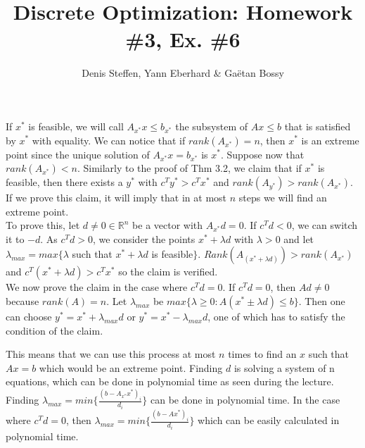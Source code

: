 \documentclass[a4paper,11pt,french]{article}
\title{Discrete Optimization: Homework \#3, Ex. \#6}
\author{Denis Steffen, Yann Eberhard \& Gaëtan Bossy}
\begin{document}
\maketitle
If $x^*$ is feasible, we will call $A_{x^*}x\leq b_{x^*}$ the subsystem of $Ax\leq b$ that is satisfied by $x^*$ with equality. 
We can notice that if $rank(A_{x^*}) = n$, then $x^*$ is an extreme point since the unique solution of $A_{x^*}x = b_{x^*}$ is $x^*$.
Suppose now that $rank(A_{x^*}) < n$. Similarly to the proof of Thm 3.2, we claim that if $x^*$ is feasible, then there exists a $y^*$ with $c^T y^* > c^T x^*$ and $rank(A_{y^*}) > rank(A_{x^*})$. If we prove this claim, it will imply that in at most $n$ steps we will find an extreme point.\\
To prove this, let $d \not= 0 \in \mathbb{R}^n$ be a vector with $A_{x^*}d = 0$. If $c^T d < 0$, we can switch it to $-d$. As $c^T d > 0$, we consider the points $x^* + \lambda d$ with $\lambda> 0$ and let $\lambda_{max}=max\{\lambda$ such that $x^* + \lambda d$ is feasible$\}$. 
$Rank(A_{(x^*+\lambda d)})>rank(A_{x^*})$ and $c^T(x^*+\lambda d)>c^Tx^*$ so the claim is verified. \\
We now prove the claim in the case where $c^T d = 0$. If $c^Td=0$, then $Ad \not= 0$ because $rank(A) = n$. 
Let $\lambda_{max}$ be $max\{\lambda \geq 0: A(x^*\pm\lambda d) \leq b\}$. Then one can choose $y^* = x^* + \lambda_{max}d$ or
$y^* = x^* - \lambda_{max}d$, one of which has to satisfy the condition of the claim. 

This means that we can use this process at most $n$ times to find an $x$ such that $Ax=b$ which would be an extreme point.
Finding $d$ is solving a system of n equations, which can be done in polynomial time as seen during the lecture. Finding $\lambda_{max} = min\{\frac{(b-A_{x^*}x^*)_i}{d_i}\}$ can be done in polynomial time. In the case where $c^Td=0$, then $\lambda_{max}=min\{\frac{(b-Ax^*)_i}{d_i}\}$ which can be easily calculated in polynomial time.
\end{document}
